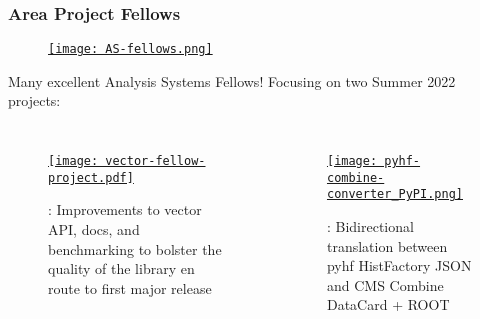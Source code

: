 \begin{frame}
  \frametitle{Area Project Fellows}

  \begin{figure}
    \begin{center}
      \href{https://iris-hep.org/as.html}{\texttt{[image: AS-fellows.png]}}
    \end{center}
  \end{figure}

  \begin{center}
    Many excellent Analysis Systems Fellows! Focusing on two Summer 2022 projects:
  \end{center}
\vspace*{-10pt}
%
  \begin{columns}
    \begin{figure}
        \begin{center}
            \href{https://iris-hep.org/fellows/Saransh-cpp.html}{\texttt{[image: vector-fellow-project.pdf]}}
        \end{center}
        : Improvements to vector API, docs, and benchmarking to bolster the quality of the library en route to first major release
    \end{figure}
%
    \vspace{10pt}
    \begin{figure}
        \begin{center}
            \href{https://iris-hep.org/fellows/peterridolfi.html}{\texttt{[image: pyhf-combine-converter\_PyPI.png]}}
        \end{center}
        : Bidirectional translation between pyhf HistFactory JSON and CMS Combine DataCard + ROOT
    \end{figure}
  \end{columns}

\end{frame}

